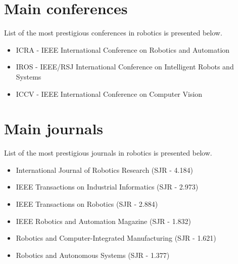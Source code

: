 \section{Main conferences}

List of the most prestigious conferences in robotics is presented below.

\begin{itemize}
	\item ICRA - IEEE International Conference on Robotics and Automation
	\item IROS - IEEE/RSJ International Conference on Intelligent Robots and Systems
	\item ICCV - IEEE International Conference on Computer Vision
\end{itemize}



\section{Main journals}

List of the most prestigious journals in robotics is presented below.

\begin{itemize}
	\item International Journal of Robotics Research (SJR - 4.184)
	\item IEEE Transactions on Industrial Informatics (SJR - 2.973)
	\item IEEE Transactions on Robotics (SJR - 2.884)
	\item IEEE Robotics and Automation Magazine (SJR - 1.832)
	\item Robotics and Computer-Integrated Manufacturing (SJR - 1.621)
	\item Robotics and Autonomous Systems (SJR - 1.377)
\end{itemize}
